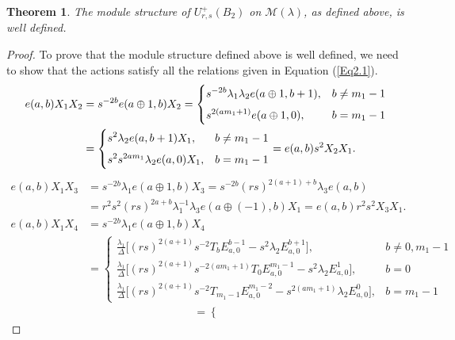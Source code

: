 \documentclass[12 pt,reqno]{amsart}
\numberwithin{equation}{section}
\newtheorem{thm}{Theorem}[section]
\theoremstyle{definition}
\theoremstyle{definition}
\theoremstyle{remark}
\theoremstyle{remark}
\begin{document}
\begin{thm}
    The module structure of $ U_{r,s}^+(B_2) $ on $ \mathcal{M}(\lambda) $, as defined above, is well defined.
\end{thm}
\begin{proof}
    To prove that the module structure defined above is well defined, we need to show that the actions satisfy all the relations given in Equation (\ref{Eq2.1}).
\begin{align*}e(a,b)X_1X_2&= s^{-2b}e(a\oplus1,b)X_2=\begin{cases}
        \displaystyle\displaystyle  s^{-2b}\lambda_1\lambda_2e(a\oplus1,b+1),&b\neq m_1-1\\[5pt]
        \displaystyle s^{2(am_1+1)}e(a\oplus1,0),&b= m_1-1
    \end{cases}\\
    &=\begin{cases} \displaystyle s^2\lambda_2e(a,b+1)X_1,& b\neq m_1-1\\[5pt]
     \displaystyle s^2s^{2am_1}\lambda_2e(a,0)X_1,&b=m_1-1
    \end{cases}=e(a,b)s^2X_2X_1.\end{align*}
    \begin{align*}
      e(a,b)X_1X_3&= s^{-2b} \lambda_1 e(a \oplus 1, b)X_3=s^{-2b}(rs)^{2(a+1)+b}\lambda_3e(a,b)\\
&=r^2s^2(rs)^{2a+b}\lambda_1^{-1}\lambda_3e(a\oplus(-1),b)X_1=e(a,b)r^2s^2X_3X_1.
    \end{align*}
\begin{align*}
      e(a,b)X_1X_4&=  s^{-2b} \lambda_1 e(a \oplus 1, b)X_4\\[5pt] &=\begin{cases}
        \displaystyle \frac{\lambda_1}{\Delta} \Bigg[ 
            (rs)^{2(a+1)} s^{-2} T_bE^{b-1}_{a,0}  - s^{2} \lambda_2 E^{b+1}_{a,0}  
        \Bigg], 
        &  b \neq 0, m_1 - 1 \\[15pt]
\displaystyle\frac{\lambda_1}{\Delta} \Bigg[ 
            (rs)^{2(a+1)} s^{-2 (a m_1+1)}  T_0 
           E^{m_1-1}_{a,0} - s^{2}  \lambda_2 E^{1}_{a,0}  
        \Bigg],  
        &  b = 0 \\[15pt]
\displaystyle\frac{\lambda_1}{\Delta} \Bigg[ 
            (rs)^{2(a+1)} s^{-2} T_{m_1-1} E^{m_1-2}_{a,0}- s^{2(am_1+1)}\lambda_2 E^{0}_{a,0}  
        \Bigg],  
        & b = m_1 - 1
\end{cases}\end{align*}
\begin{align*}
    &=\begin{cases}

\end{cases}
\end{align*}
\end{proof}
\end{document}
